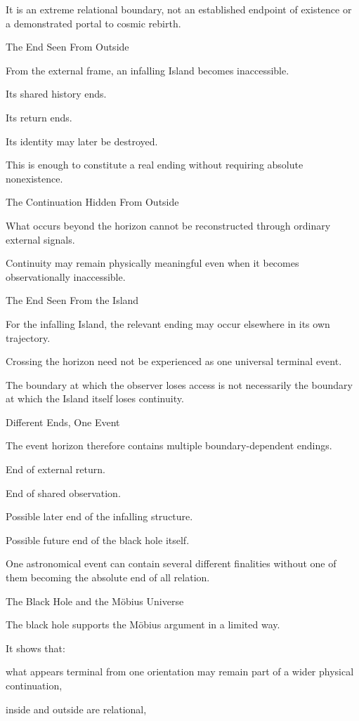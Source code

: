 It is an extreme relational boundary, not an established endpoint of existence or a demonstrated portal to cosmic rebirth.

The End Seen From Outside

From the external frame, an infalling Island becomes inaccessible.

Its shared history ends.

Its return ends.

Its identity may later be destroyed.

This is enough to constitute a real ending without requiring absolute nonexistence.

The Continuation Hidden From Outside

What occurs beyond the horizon cannot be reconstructed through ordinary external signals.

Continuity may remain physically meaningful even when it becomes observationally inaccessible.

The End Seen From the Island

For the infalling Island, the relevant ending may occur elsewhere in its own trajectory.

Crossing the horizon need not be experienced as one universal terminal event.

The boundary at which the observer loses access is not necessarily the boundary at which the Island itself loses continuity.

Different Ends, One Event

The event horizon therefore contains multiple boundary-dependent endings.

End of external return.

End of shared observation.

Possible later end of the infalling structure.

Possible future end of the black hole itself.

One astronomical event can contain several different finalities without one of them becoming the absolute end of all relation.

The Black Hole and the Möbius Universe

The black hole supports the Möbius argument in a limited way.

It shows that:

what appears terminal from one orientation may remain part of a wider physical continuation,

inside and outside are relational,

